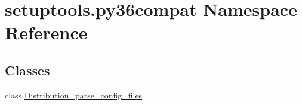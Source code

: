 \hypertarget{namespacesetuptools_1_1py36compat}{}\section{setuptools.\+py36compat Namespace Reference}
\label{namespacesetuptools_1_1py36compat}
\subsection*{Classes}
\begin{DoxyCompactItemize}
\item 
class \hyperlink{classsetuptools_1_1py36compat_1_1_distribution__parse__config__files}{Distribution\+\_\+parse\+\_\+config\+\_\+files}
\end{DoxyCompactItemize}
